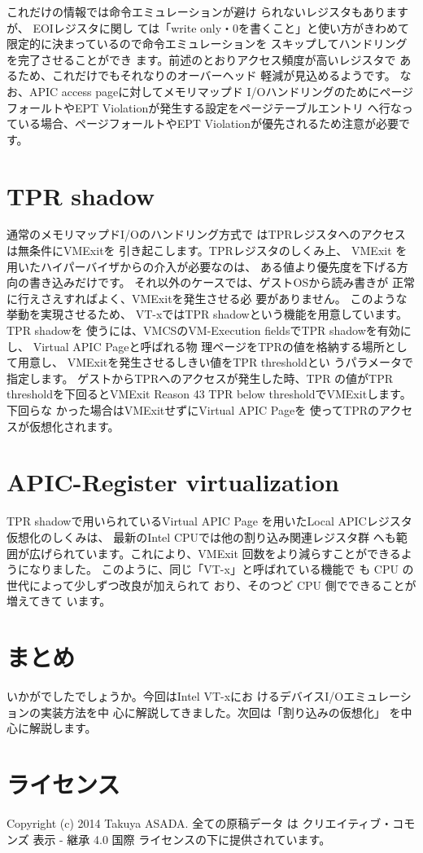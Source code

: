  これだけの情報では命令エミュレーションが避け
られないレジスタもありますが、 EOIレジスタに関し
ては「write only・0を書くこと」と使い方がきわめて
限定的に決まっているので命令エミュレーションを
スキップしてハンドリングを完了させることができ
ます。前述のとおりアクセス頻度が高いレジスタで
あるため、これだけでもそれなりのオーバーヘッド
軽減が見込めるようです。
 なお、APIC access pageに対してメモリマップド
I/OハンドリングのためにページフォールトやEPT
Violationが発生する設定をページテーブルエントリ
へ行なっている場合、ページフォールトやEPT
Violationが優先されるため注意が必要です。

\section{TPR shadow}

 通常のメモリマップドI/Oのハンドリング方式で
はTPRレジスタへのアクセスは無条件にVMExitを
引き起こします。TPRレジスタのしくみ上、 VMExit
を用いたハイパーバイザからの介入が必要なのは、
ある値より優先度を下げる方向の書き込みだけです。
それ以外のケースでは、ゲストOSから読み書きが
正常に行えさえすればよく、VMExitを発生させる必
要がありません。
 このような挙動を実現させるため、 VT-xではTPR
shadowという機能を用意しています。 TPR shadowを
使うには、VMCSのVM-Execution fieldsでTPR
shadowを有効にし、 Virtual APIC Pageと呼ばれる物
理ページをTPRの値を格納する場所として用意し、
VMExitを発生させるしきい値をTPR thresholdとい
うパラメータで指定します。
 ゲストからTPRへのアクセスが発生した時、TPR
の値がTPR thresholdを下回るとVMExit Reason 43
TPR below thresholdでVMExitします。下回らな
かった場合はVMExitせずにVirtual APIC Pageを
使ってTPRのアクセスが仮想化されます。

\section{APIC-Register virtualization}

 TPR shadowで用いられているVirtual APIC Page
を用いたLocal APICレジスタ仮想化のしくみは、
最新のIntel CPUでは他の割り込み関連レジスタ群
へも範囲が広げられています。これにより、VMExit
回数をより減らすことができるようになりました。
 このように、同じ「VT-x」と呼ばれている機能で
も CPU の世代によって少しずつ改良が加えられて
おり、そのつど CPU 側でできることが増えてきて
います。


\section{まとめ}

 いかがでしたでしょうか。今回はIntel VT-xにお
けるデバイスI/Oエミュレーションの実装方法を中
心に解説してきました。次回は「割り込みの仮想化」
を中心に解説します。

\section{ライセンス}
Copyright (c) 2014 Takuya ASADA.
全ての原稿データ は クリエイティブ・コモンズ 表示 - 継承 4.0 国際 ライセンスの下に提供されています。



